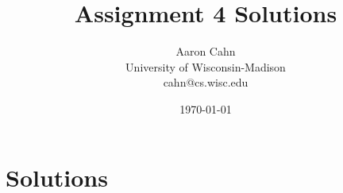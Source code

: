 \documentclass[12pt]{article}
\begin{document}
\title{Assignment 4 Solutions}
\date{\today}



\author{
Aaron Cahn\\
University of Wisconsin-Madison\\
cahn@cs.wisc.edu
}

\maketitle

\newpage
\section{Solutions} \label{sec:solutions} 

%
%
\end{document}
